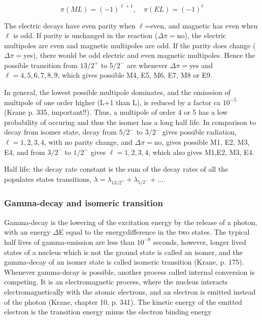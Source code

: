 \documentclass[a4paper,11pt,twoside]{book}
\begin{document}
\begin{equation}
    \pi(ML) = (-1)^{\ell+1}, \quad \pi(EL)=(-1)^{\ell}
\end{equation}
 
The electric decays have even parity when $\ell$=even, and magnetic has even when $\ell$ is odd. If parity is unchanged in the reaction ($\Delta \pi=$no), the electric multipoles are even and magnetic multipoles are odd. If the parity does change ($\Delta\pi=$yes), there would be odd electric and even magnetic multipoles. Hence the possible transition from $13/2^+$ to $5/2^-$ are whenever $\Delta \pi=$yes and $\ell=4,5,6,7,8,9$, which gives possible M4, E5, M6, E7, M8 or E9. 

In general, the lowest possible multipole dominates, and the emisssion of multipole of one order higher (L+1 than L), is reduced by a factor ca $10^{-5}$ (Krane p. 335, important!!). Thus, a multipole of order 4 or 5 has a low probability of occuring and thus the isomer has a long half life.  
In comparison to decay from isomer state, decay from $5/2^-$ to $3/2^-$ gives possible radiation, $\ell=1,2,3,4$, with no parity change, and $\Delta \pi=$no, gives possible M1, E2, M3, E4, and from $3/2^-$ to $1/2^-$ gives $\ell=1,2,3,4$, which also gives M1,E2, M3, E4. 

Half life: the decay rate constant is the sum of the decay rates of all the populates states  transitions, $\lambda=\lambda_{13/2^+} + \lambda_{5/2^-}+ ...$. 







\subsubsection{Gamma-decay and isomeric transition}
Gamma-decay is the lowering of the excitation energy by the release of a photon, with an energy $\Delta$E equal to the energydifference in the two states. The typical half lives of gamma-emission are less than $10^{-9}$ seconds, however, longer lived states of a nucleus which is not the ground state is called an isomer, and the gamma-decay of an isomer state is called isomeric transition (Krane, p. 175). Whenever gamma-decay is possible, another process called internal conversion is competing. It is an electromagnetic process, where the nucleus interacts electromagnetically with the atomic electrons, and an electron is emitted instead of the photon (Krane, chapter 10, p. 341). The kinetic energy of the emitted electron is the transition energy minus the electron binding energy
\end{document}
